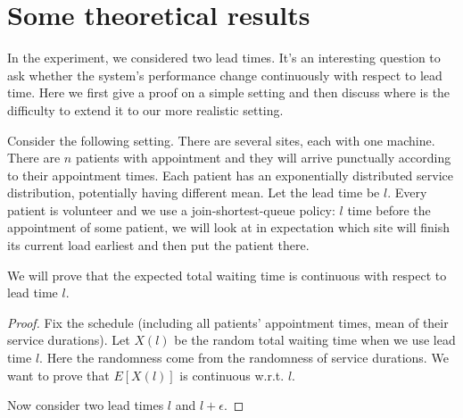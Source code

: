 \section{Some theoretical results}

In the experiment, we considered two lead times. It's an interesting question
to ask whether the system's performance change continuously with respect to
lead time. Here we first give a proof on a simple setting and then discuss
where is the difficulty to extend it to our more realistic setting.

Consider the following setting. There are several sites, each with one machine.
There are $n$ patients with appointment and they will arrive punctually
according to their appointment times. Each patient has an exponentially
distributed service distribution, potentially having different mean.
Let the lead time be $l$. Every patient is volunteer and we use a
join-shortest-queue policy: $l$ time before the appointment of some patient,
we will look at in expectation which site will finish its current load
earliest and then put the patient there.

We will prove that the expected total waiting time is continuous with
respect to lead time $l$.

\begin{proof}
Fix the schedule (including all patients' appointment times, mean of their
service durations). Let $X(l)$ be the random total waiting time when we
use lead time $l$. Here the randomness come from the randomness of service
durations. We want to prove that $E[X(l)]$ is continuous w.r.t. $l$.

Now consider two lead times $l$ and $l+\epsilon$.
\end{proof}
